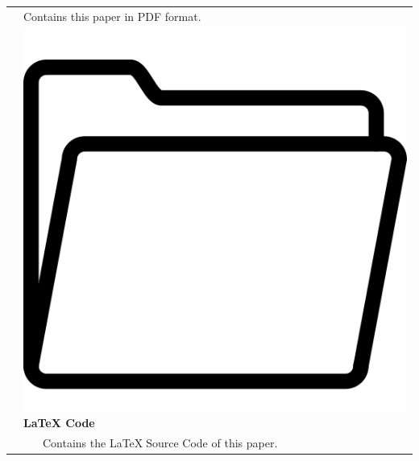 \begin{table}[ht]
\begin{tabularx}{\textwidth}{llX}
    \hspace{.066\textwidth}   & \multicolumn{2}{l}{Contains this paper in PDF format.}                 \\
    \hspace{.066\textwidth}   & \multicolumn{2}{l}{\includegraphics[height=.014\textheight]{Figures/icon_folder.png} \textbf{LaTeX Code}} \\
    \hspace{.066\textwidth}   & \hspace{.066\textwidth}   & Contains the \LaTeX$\;$Source Code of this paper.              \\
  \end{tabularx}
\end{table}